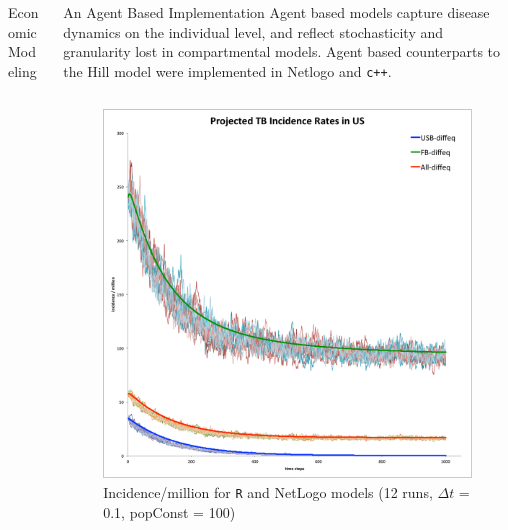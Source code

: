 \documentclass[final]{beamer}
\begin{document}
\begin{frame}
\begin{columns}
\begin{column}{.3\textwidth}
\begin{block}{Economic Modeling}
\begin{block}{}
\begin{column}{.26\textwidth}
          \end{column}
        \end{block}
      \end{block}
    \end{column}
    \begin{column}{.3\textwidth}
      \vspace{-.5em}
      \begin{block}{An Agent Based Implementation}
        Agent based models capture disease dynamics on the individual level, and
        reflect stochasticity and granularity lost in compartmental models.
        Agent based counterparts to the Hill model were implemented in Netlogo
        and \texttt{c++}.
        \begin{block}{}
          \vspace{-2em}
          \begin{column}{.45\textwidth}
            \begin{figure}[h]
              \begin{center}
                \includegraphics[width=\textwidth]{NLHMinc}
              \end{center}
              \caption{Incidence/million for \texttt{R} and NetLogo models (12 runs, $\Delta t$ = 0.1, popConst = 100)}
              \label{fig:NLHMinc}
            \end{figure}

\end{column}
\end{block}
\end{block}
\end{column}
\end{columns}
\end{frame}
\end{document}
